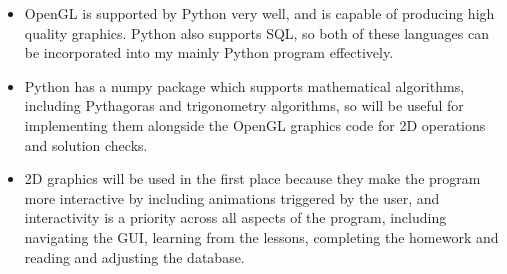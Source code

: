 \begin{itemize}
	\item OpenGL is supported by Python very well, and is capable of producing high quality graphics. Python also supports SQL, so both of these languages can be incorporated into my mainly Python program effectively.

	\item Python has a numpy package which supports mathematical algorithms, including Pythagoras and trigonometry algorithms, so will be useful for implementing them alongside the OpenGL graphics code for 2D operations and solution checks.

	\item  2D graphics will be used in the first place because they make the program more interactive by including animations triggered by the user, and interactivity is a priority across all aspects of the program, including navigating the GUI, learning from the lessons, completing the homework and reading and adjusting the database.

\end{itemize}